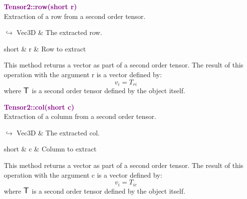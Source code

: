\textcolor{purple}{\textbf{Tensor2::row(short r)}}\label{Tensor2::row(short r)}\\
Extraction of a row from a second order tensor.\vspace*{-0.5em}
\begin{tcolorbox}[grow to left by=-1cm, width=\textwidth-1cm,myArgs,tabularx={l|R}]
$\hookrightarrow$ Vec3D & The extracted row.
\end{tcolorbox}

\begin{tcolorbox}[width=\textwidth,myArgs,tabularx={ll|R}]
short & r & Row to extract
\end{tcolorbox}

This method returns a vector as part of a second order tensor.
The result of this operation with the argument r is a vector defined by:
\begin{equation*}
v_{i} = T_{ri}
\end{equation*}
where $\mbox{\large\ensuremath{\mathsf{T}}}$ is a second order tensor defined by the object itself.

\textcolor{purple}{\textbf{Tensor2::col(short c)}}\label{Tensor2::col(short c)}\\
Extraction of a column from a second order tensor.\vspace*{-0.5em}
\begin{tcolorbox}[grow to left by=-1cm, width=\textwidth-1cm,myArgs,tabularx={l|R}]
$\hookrightarrow$ Vec3D & The extracted col.
\end{tcolorbox}

\begin{tcolorbox}[width=\textwidth,myArgs,tabularx={ll|R}]
short & c & Column to extract
\end{tcolorbox}

This method returns a vector as part of a second order tensor.
The result of this operation with the argument c is a vector defined by:
\begin{equation*}
v_{i} = T_{ic}
\end{equation*}
where $\mbox{\large\ensuremath{\mathsf{T}}}$ is a second order tensor defined by the object itself.

